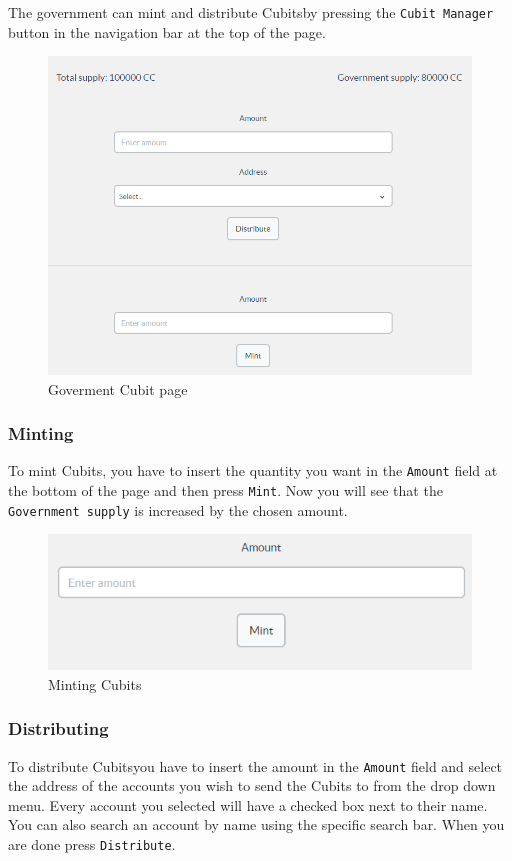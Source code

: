 	The government can mint and distribute Cubits\glosp by pressing the \texttt{Cubit 
	Manager} button in the navigation bar at the top of the page.
	\begin{figure}[H]
		\includegraphics[width=15cm]{res/images/cubit_manager.png}
		\centering
		\caption{Goverment Cubit page}
	\end{figure}
		\subsubsection{Minting}
		To mint Cubits\glo{}, you have to insert the quantity you want in the 
		\texttt{Amount} field at the bottom of the page and then press \texttt{Mint}. Now you will 
		see that the \texttt{Government supply} is increased by the chosen amount.
		\begin{figure}[H]
			\includegraphics[width=15cm]{res/images/minting_cubits.png}
			\centering
			\caption{Minting Cubits}
		\end{figure}
		\subsubsection{Distributing}
		To distribute Cubits\glosp you have to insert the amount in the \texttt{Amount} 
		field and select the address of the accounts you wish to send the Cubits to 
		from the drop down menu. Every account you selected will have a checked 
		box next to their name. You can also search an account by name using the 
		specific search bar. When you are done press \texttt{Distribute}.\\

